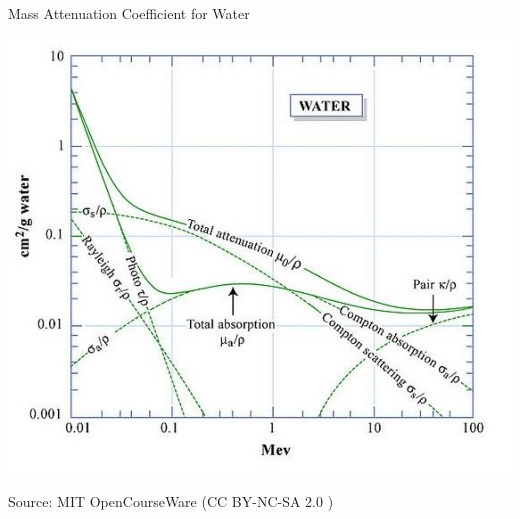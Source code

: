 \begin{frame}{Mass Attenuation Coefficient for Water}
    \begin{center}\includegraphics[height=0.8\textheight ]{images/Mass-attenuation-coefficients-for-photons-in-water-source-MIT-OpenCourseWare-22101.png}\end{center}
    \begin{flushright}
        \tiny Source: MIT OpenCourseWare (CC BY-NC-SA 2.0 )
    \end{flushright}
\end{frame}




